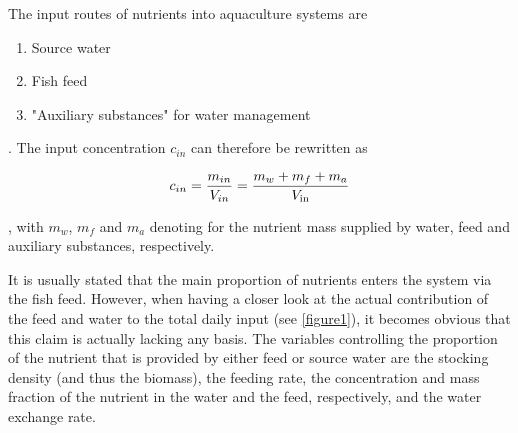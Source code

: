\documentclass{scrartcl}
\begin{document}
The input routes of nutrients into aquaculture systems are 
\begin{enumerate}
	\item Source water
	\item Fish feed
	\item "Auxiliary substances" for water management
\end{enumerate}

. The input concentration $c_{in}$ can therefore be rewritten as

\begin{align}
	c_{in} = \frac{m_{in}}{V_{in}} = \frac{m_{w} + m_{f} + m_{a}}{V_{\ce{in}}}
\end{align}

, with $m_{w}$, $m_{f}$ and $m_{a}$ denoting for the nutrient mass supplied by water, feed and auxiliary substances, respectively. 



It is usually stated that the main proportion of nutrients enters the system via the fish feed. However, when having a closer look at the actual contribution of the feed and water to the total daily input (see \ref{figure1}), it becomes obvious that this claim is actually lacking any basis. The variables controlling the proportion of the nutrient that is provided by either feed or source water are the stocking density (and thus the biomass), the feeding rate, the concentration and mass fraction of the nutrient in the water and the feed, respectively, and the water exchange rate.\\





\end{document}
